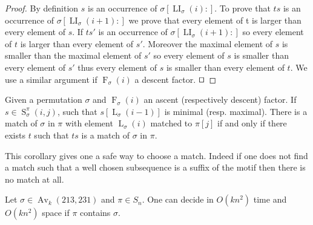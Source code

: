 \documentclass[a4paper]{llncs}
\DeclareMathOperator{\AV}{Av}
\newcommand{\ptext}{\pi}
\newcommand{\pmotif}{\sigma}
\DeclareMathOperator{\firsta}{L}
\newcommand{\first}[2]{\firsta_{{#1}}({#2})}
\DeclareMathOperator{\firstia}{LI}
\newcommand{\firsti}[2]{\firstia_{{#1}}({#2})}
\DeclareMathOperator{\factora}{F}
\newcommand{\factor}[2]{\factora_{{#1}}({#2})}
\DeclareMathOperator{\SETa}{S}
\newcommand{\SET}[4]{\SETa_{{#1}}^{{#2}}({#3},{#4})}
\begin{document}
\begin{proof}
By definition $s$ is an occurrence of $\pmotif[\firsti{\pmotif}{i}:]$. To prove that $ts$ is an occurrence of $\pmotif[\firsti{\pmotif}{i+1}:]$ we prove that every element of t is larger than every element of $s$. If $ts'$ is an occurrence of $\pmotif[\firsti{\pmotif}{i+1}:]$ so every element of $t$ is larger than every element of $s'$. Moreover the maximal element of $s$ is smaller than  the maximal element of $s'$ so every element of $s$ is smaller than every element of $s'$ thus every element of $s$ is smaller than every element of $t$. We use a similar argument if $\factor{\pmotif}{i}$ a descent factor.
$\qed$
\end{proof}

\begin{corollary}
Given a permutation $\pmotif$ and $\factor{\pmotif}{i}$ an ascent (respectively descent) factor.
If $s \in \SET{\pmotif}{\ptext}{i}{j}$, such that $s[\first{\pmotif}{i-1}]$ is minimal (resp. maximal). There is a match of $\pmotif$ in $\ptext$ with element $\first{\pmotif}{i}$ matched to $\ptext[j]$ if and only if there exists $t$ such that $ts$ is a match of $\pmotif$ in $\ptext$. 
\end{corollary}

This corollary gives one a safe way to choose a match. Indeed if one does not find a match such that a well chosen subsequence is a suffix of the motif then there is no match at all.

\begin{proposition}
	\label{Proposition:sigma avoids 213 and 231}
	Let $\sigma \in \AV_k(213,231)$ and $\pi \in S_n$.
	One can decide in $O(kn^2)$ time
	and $O(kn^2)$ space if $\pi$ contains $\sigma$.
\end{proposition}

\end{document}
